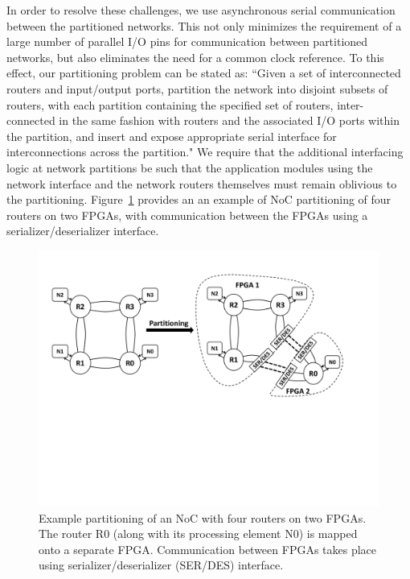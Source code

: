 \documentclass[conference, 9pt]{IEEEtran}
\begin{document}
In order to resolve these challenges, we use asynchronous serial communication between the partitioned networks. This not only minimizes the requirement of a large number of parallel I/O pins for communication between partitioned networks, but also eliminates the need for a common clock reference. To this effect, our partitioning problem can be stated as: ``Given a set of interconnected routers and input/output ports, partition the network into disjoint subsets of routers, with each partition containing the specified set of routers, inter-connected in the same fashion with routers and the associated I/O ports within the partition, and insert and expose appropriate serial interface for interconnections across the partition." We require that the additional interfacing logic at network partitions be such that the application  modules using the network interface and the network routers themselves must remain oblivious to the partitioning. Figure~\ref{fig:part} provides an an example of NoC 
partitioning of four routers on two FPGAs, with communication between the FPGAs using a serializer/deserializer interface. 


\begin{figure}[t!]
\centering
\includegraphics[scale=0.2]{figs/partitioning.pdf}
\caption{Example partitioning of an NoC with four routers on two FPGAs. The router R0 (along with its processing element N0) is mapped onto a separate FPGA. Communication between FPGAs takes place using serializer/deserializer (SER/DES) interface.}
\label{fig:part}
\end{figure}


\end{document}
